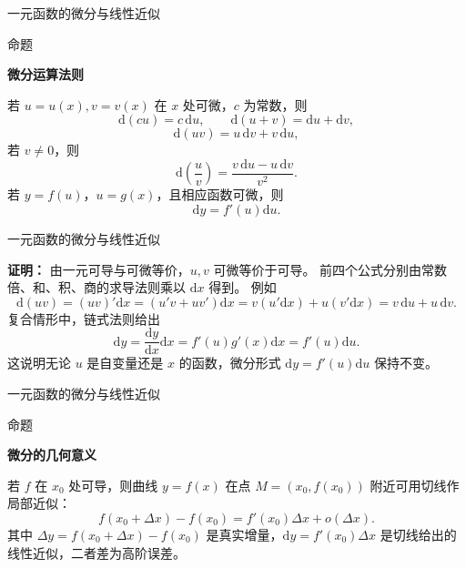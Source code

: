 \documentclass[aspectratio=169,10pt,fontset=fandol]{ctexbeamer}
\newcommand{\dd}{\mathrm{d}}
\begin{document}
\begin{frame}[t,fragile]{一元函数的微分与线性近似}
\footnotesize
\begin{block}{命题}
{\footnotesize
\textbf{微分运算法则}\par

若 $u=u(x),v=v(x)$ 在 $x$ 处可微，$c$ 为常数，则
\[
\dd(cu)=c\,\dd u,\qquad \dd(u+v)=\dd u+\dd v,
\]
\[
\dd(uv)=u\,\dd v+v\,\dd u,
\]
若 $v\neq0$，则
\[
\dd\left(\frac{u}{v}\right)=\frac{v\,\dd u-u\,\dd v}{v^2}.
\]
若 $y=f(u)$，$u=g(x)$，且相应函数可微，则
\[
\dd y=f'(u)\dd u.
\]

}
\end{block}
\end{frame}
\begin{frame}[t,fragile]{一元函数的微分与线性近似}
\footnotesize
{\footnotesize
\textbf{证明：}
由一元可导与可微等价，$u,v$ 可微等价于可导。 前四个公式分别由常数倍、和、积、商的求导法则乘以 $\dd x$ 得到。 例如
\[
\dd(uv)=(uv)'\dd x=(u'v+uv')\dd x=v(u'\dd x)+u(v'\dd x)=v\,\dd u+u\,\dd v.
\]
复合情形中，链式法则给出
\[
\dd y=\frac{\dd y}{\dd x}\dd x=f'(u)g'(x)\dd x=f'(u)\dd u.
\]
这说明无论 $u$ 是自变量还是 $x$ 的函数，微分形式 $\dd y=f'(u)\dd u$ 保持不变。

}
\end{frame}
\begin{frame}[t,fragile]{一元函数的微分与线性近似}
\normalsize
\begin{block}{命题}
{\normalsize
\textbf{微分的几何意义}\par

若 $f$ 在 $x_0$ 处可导，则曲线 $y=f(x)$ 在点 $M=(x_0,f(x_0))$ 附近可用切线作局部近似：
\[
f(x_0+\Delta x)-f(x_0)=f'(x_0)\Delta x+o(\Delta x).
\]
其中 $\Delta y=f(x_0+\Delta x)-f(x_0)$ 是真实增量，$\dd y=f'(x_0)\Delta x$ 是切线给出的线性近似，二者差为高阶误差。

}
\end{block}
\end{frame}
\end{document}
